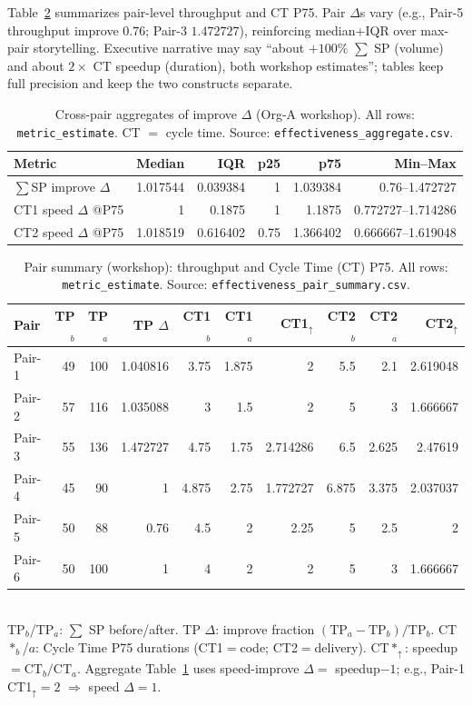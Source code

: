 \documentclass[10pt,conference]{IEEEtran}
\begin{document}
Table~\ref{tab:effectiveness-pairs} summarizes pair-level throughput and CT P75.
Pair $\Delta$s vary (e.g., Pair-5 throughput improve $0.76$; Pair-3 $1.472727$), reinforcing median+IQR over max-pair storytelling.
Executive narrative may say ``about $+100\%$ $\sum$ SP (volume) and about $2\times$ CT speedup (duration), both workshop estimates''; tables keep full precision and keep the two constructs separate.

\begin{table}[!t]
\centering
\caption{Cross-pair aggregates of improve $\Delta$ (Org-A workshop). All rows: \texttt{metric\_estimate}. CT $=$ cycle time. Source: \texttt{effectiveness\_aggregate.csv}.}
\label{tab:effectiveness-agg}
\begin{tabular}{@{}lrrrrr@{}}
\toprule
Metric & Median & IQR & p25 & p75 & Min--Max \\
\midrule
$\sum$SP improve $\Delta$ & 1.017544 & 0.039384 & 1 & 1.039384 & 0.76--1.472727 \\
CT1 speed $\Delta$ @P75 & 1 & 0.1875 & 1 & 1.1875 & 0.772727--1.714286 \\
CT2 speed $\Delta$ @P75 & 1.018519 & 0.616402 & 0.75 & 1.366402 & 0.666667--1.619048 \\
\bottomrule
\end{tabular}
\end{table}

\begin{table}[!t]
\centering
\caption{Pair summary (workshop): throughput and Cycle Time (CT) P75. All rows: \texttt{metric\_estimate}. Source: \texttt{effectiveness\_pair\_summary.csv}.}
\label{tab:effectiveness-pairs}
\setlength{\tabcolsep}{4pt}
\begin{tabular}{@{}lrrrrrrrrr@{}}
\toprule
Pair & TP$_b$ & TP$_a$ & TP $\Delta$ & CT1$_b$ & CT1$_a$ & CT1$_{\uparrow}$ & CT2$_b$ & CT2$_a$ & CT2$_{\uparrow}$ \\
\midrule
Pair-1 & 49 & 100 & 1.040816 & 3.75 & 1.875 & 2 & 5.5 & 2.1 & 2.619048 \\
Pair-2 & 57 & 116 & 1.035088 & 3 & 1.5 & 2 & 5 & 3 & 1.666667 \\
Pair-3 & 55 & 136 & 1.472727 & 4.75 & 1.75 & 2.714286 & 6.5 & 2.625 & 2.47619 \\
Pair-4 & 45 & 90 & 1 & 4.875 & 2.75 & 1.772727 & 6.875 & 3.375 & 2.037037 \\
Pair-5 & 50 & 88 & 0.76 & 4.5 & 2 & 2.25 & 5 & 2.5 & 2 \\
Pair-6 & 50 & 100 & 1 & 4 & 2 & 2 & 5 & 3 & 1.666667 \\
\bottomrule
\end{tabular}\\[0.4em]
{\footnotesize TP$_b$/TP$_a$: $\sum$ SP before/after. TP $\Delta$: improve fraction $(\mathrm{TP}_a-\mathrm{TP}_b)/\mathrm{TP}_b$. CT$*_b$/$a$: Cycle Time P75 durations (CT1$=$code; CT2$=$delivery). CT$*_{\uparrow}$: speedup $=\mathrm{CT}_b/\mathrm{CT}_a$. Aggregate Table~\ref{tab:effectiveness-agg} uses speed-improve $\Delta=$ speedup$-1$; e.g., Pair-1 CT1$_{\uparrow}=2$ $\Rightarrow$ speed $\Delta=1$.}
\end{table}
\end{document}
